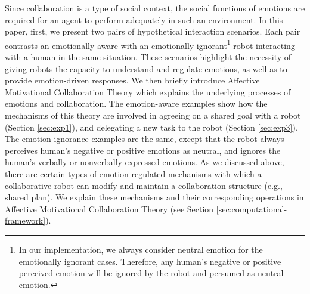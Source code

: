 Since collaboration is a type of social context, the social functions of
emotions are required for an agent to perform adequately in such an environment.
In this paper, first, we present two pairs of hypothetical interaction
scenarios. Each pair contrasts an emotionally-aware with an emotionally
ignorant\footnote{In our implementation, we always consider neutral emotion for
the emotionally ignorant cases. Therefore, any human's negative or positive
perceived emotion will be ignored by the robot and persumed as neutral emotion.}
robot interacting with a human in the same situation. These scenarios highlight
the necessity of giving robots the capacity to understand and regulate emotions,
as well as to provide emotion-driven responses. We then briefly introduce
Affective Motivational Collaboration Theory which explains the underlying
processes of emotions and collaboration. The emotion-aware examples show how the
mechanisms of this theory are involved in agreeing on a shared goal with a robot
(Section \ref{sec:exp1}), and delegating a new task to the robot (Section
\ref{sec:exp3}). The emotion ignorance examples are the same, except that the
robot always perceives human's negative or positive emotions as neutral, and
ignores the human's verbally or nonverbally expressed emotions. As we discussed
above, there are certain types of emotion-regulated mechanisms with which a
collaborative robot can modify and maintain a collaboration structure (e.g.,
shared plan). We explain these mechanisms and their corresponding operations in
Affective Motivational Collaboration Theory (see Section
\ref{sec:computational-framework}).

